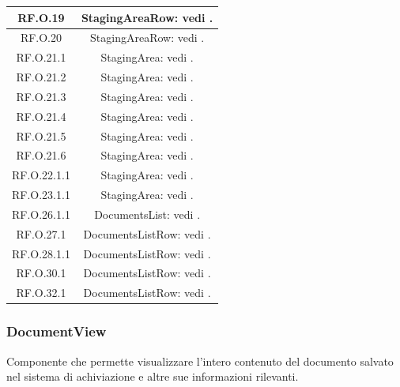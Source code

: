 \documentclass[10pt, a4paper]{article}
\begin{document}
\begin{xltabular}{\textwidth}{c|c}
\hline
RF.O.19 & StagingAreaRow: vedi . \\ %
\hline
RF.O.20 & StagingAreaRow: vedi . \\  %
\hline
RF.O.21.1 & StagingArea: vedi .\\%
\hline
RF.O.21.2 & StagingArea: vedi .\\%
\hline
RF.O.21.3 &  StagingArea: vedi .\\ %
\hline
RF.O.21.4 &  StagingArea: vedi .\\%
\hline
RF.O.21.5 & StagingArea: vedi .\\ %
\hline
RF.O.21.6 & StagingArea: vedi .\\%
\hline
RF.O.22.1.1 & StagingArea: vedi .\\
\hline
RF.O.23.1.1 & StagingArea: vedi .\\
\hline
RF.O.26.1.1  & DocumentsList: vedi .\\%
\hline
RF.O.27.1 &  DocumentsListRow: vedi .\\%
\hline
RF.O.28.1.1 & DocumentsListRow: vedi . \\%
\hline
RF.O.30.1 & DocumentsListRow: vedi . \\ %
\hline
RF.O.32.1 & DocumentsListRow: vedi .\\%
\end{xltabular}

\subsubsection{DocumentView}
Componente che permette visualizzare l'intero contenuto del documento salvato nel sistema di achiviazione e altre sue informazioni rilevanti.
\end{document}

